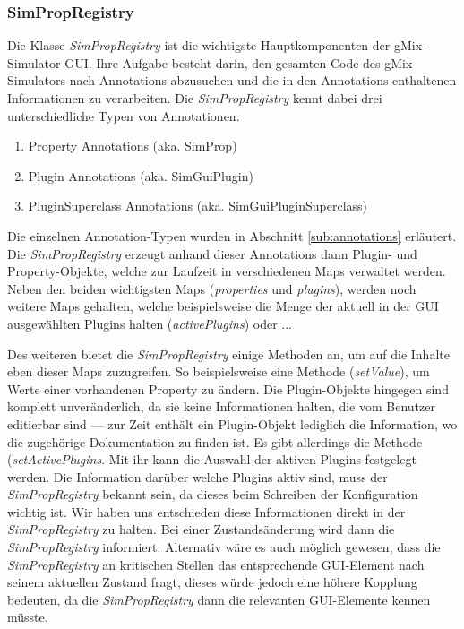 \documentclass[a4paper, 11pt]{article} %
\begin{document}
\subsubsection{SimPropRegistry}
\label{sssub:simpropregistry}
Die Klasse \emph{SimPropRegistry} ist die wichtigste Hauptkomponenten der gMix-Simulator-GUI. Ihre Aufgabe besteht darin, den gesamten Code des gMix-Simulators nach Annotations abzusuchen und die in den Annotations enthaltenen Informationen zu verarbeiten. Die \emph{SimPropRegistry} kennt dabei drei unterschiedliche Typen von Annotationen.

\begin{enumerate}
	\item Property Annotations (aka. SimProp)
	\item Plugin Annotations (aka. SimGuiPlugin)
	\item PluginSuperclass Annotations (aka. SimGuiPluginSuperclass)
\end{enumerate}

Die einzelnen Annotation-Typen wurden in Abschnitt \ref{sub:annotations} erläutert. Die \emph{SimPropRegistry} erzeugt anhand dieser Annotations dann Plugin- und Property-Objekte, welche zur Laufzeit in verschiedenen Maps verwaltet werden. Neben den beiden wichtigsten Maps (\emph{properties} und \emph{plugins}), werden noch weitere Maps gehalten, welche beispielsweise die Menge der aktuell in der GUI ausgewählten Plugins halten (\emph{activePlugins}) oder ...

Des weiteren bietet die \emph{SimPropRegistry} einige Methoden an, um auf die Inhalte eben dieser Maps zuzugreifen. So beispielsweise eine Methode (\emph{setValue}), um Werte einer vorhandenen Property zu ändern. Die Plugin-Objekte hingegen sind komplett unveränderlich, da sie keine Informationen halten, die vom Benutzer editierbar sind --- zur Zeit enthält ein Plugin-Objekt lediglich die Information, wo die zugehörige Dokumentation zu finden ist. Es gibt allerdings die Methode (\emph{setActivePlugins}. Mit ihr kann die Auswahl der aktiven Plugins festgelegt werden. Die Information darüber welche Plugins aktiv sind, muss der \emph{SimPropRegistry} bekannt sein, da dieses beim Schreiben der Konfiguration wichtig ist. Wir haben uns entschieden diese Informationen direkt in der \emph{SimPropRegistry} zu halten. Bei einer Zustandsänderung wird dann die \emph{SimPropRegistry} informiert. Alternativ wäre es auch möglich gewesen, dass die \emph{SimPropRegistry} an kritischen Stellen das entsprechende GUI-Element nach seinem aktuellen Zustand fragt, dieses würde jedoch eine höhere Kopplung bedeuten, da die \emph{SimPropRegistry} dann die relevanten GUI-Elemente kennen müsste.
\end{document}
